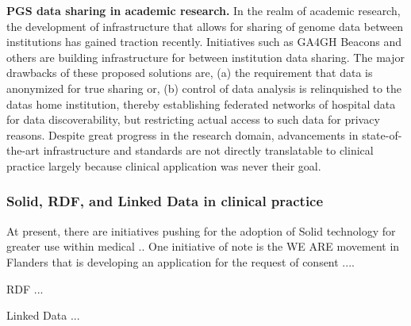 \documentclass[runningheads]{llncs}
\begin{document}
\textbf{PGS data sharing in academic research.}
In the realm of academic research, the development of infrastructure that allows for sharing of genome data between institutions has gained traction recently. 
Initiatives such as GA4GH Beacons \cite{rambla_beacon_2022} and others are building infrastructure for between institution data sharing. 
The major drawbacks of these proposed solutions are, (a) the requirement that data is anonymized for true sharing or, (b) control of data analysis is relinquished to the data\textquotesingle s home institution, thereby establishing federated networks of hospital data for data discoverability, but restricting actual access to such data for privacy reasons.
Despite great progress in the research domain, advancements in state-of-the-art infrastructure and standards are not directly translatable to clinical practice largely because clinical application was never their goal. 

\subsubsection{Solid, RDF, and Linked Data in clinical practice}
At present, there are initiatives pushing for the adoption of Solid technology for greater use within medical ..
One initiative of note is the WE ARE movement in Flanders that is developing an application for the request of consent ....

RDF ...

Linked Data ...
\end{document}

